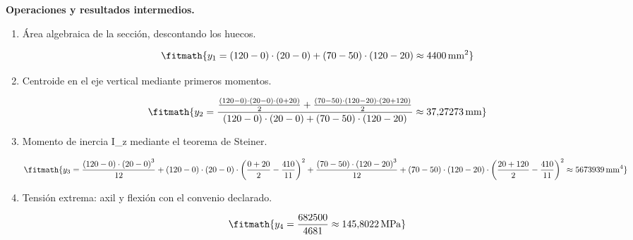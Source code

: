 \noindent\textbf{Operaciones y resultados intermedios.}

\begin{enumerate}

\item Área algebraica de la sección, descontando los huecos.

\[\fitmath{y_{1}=\left(120-0\right)\cdot \left(20-0\right)+\left(70-50\right)\cdot \left(120-20\right)\approx 4400\,\mathrm{mm^{2}}}\]

\item Centroide en el eje vertical mediante primeros momentos.

\[\fitmath{y_{2}=\frac{\frac{\left(120-0\right)\cdot \left(20-0\right)\cdot \left(0+20\right)}{2}+\frac{\left(70-50\right)\cdot \left(120-20\right)\cdot \left(20+120\right)}{2}}{\left(120-0\right)\cdot \left(20-0\right)+\left(70-50\right)\cdot \left(120-20\right)}\approx 37{,}27273\,\mathrm{mm}}\]

\item Momento de inercia I\_z mediante el teorema de Steiner.

\[\fitmath{y_{3}=\frac{\left(120-0\right)\cdot {\left(20-0\right)}^{3}}{12}+\left(120-0\right)\cdot \left(20-0\right)\cdot {\left(\frac{0+20}{2}-\frac{410}{11}\right)}^{2}+\frac{\left(70-50\right)\cdot {\left(120-20\right)}^{3}}{12}+\left(70-50\right)\cdot \left(120-20\right)\cdot {\left(\frac{20+120}{2}-\frac{410}{11}\right)}^{2}\approx 5673939\,\mathrm{mm^{4}}}\]

\item Tensión extrema: axil y flexión con el convenio declarado.

\[\fitmath{y_{4}=\frac{682500}{4681}\approx 145{,}8022\,\mathrm{MPa}}\]

\end{enumerate}
